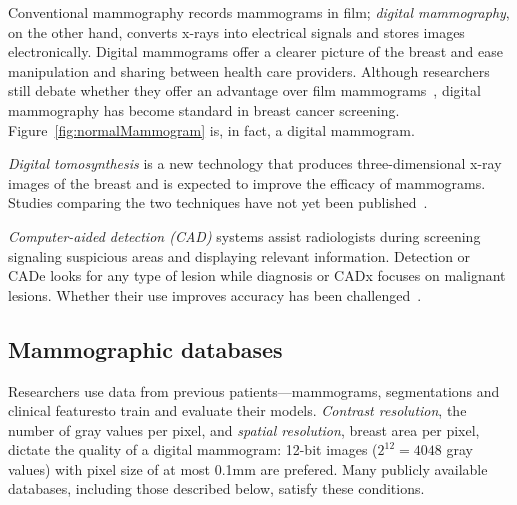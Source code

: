 Conventional mammography records mammograms in film; \emph{digital mammography}, on the other hand, converts x-rays into electrical signals and stores images electronically.
Digital mammograms offer a clearer picture of the breast and ease manipulation and sharing between health care providers.
Although researchers still debate whether they offer an advantage over film mammograms~\cite{Kerlikowske2011, Pisano2008, Skaane2007}, digital mammography has become standard in breast cancer screening. Figure~\ref{fig:normalMammogram} is, in fact, a digital mammogram.

\emph{Digital tomosynthesis} is a new technology that produces three-dimensional x-ray images of the breast and is expected to improve the efficacy of mammograms. Studies comparing the two techniques have not yet been published~\cite{NCI2014}.

\emph{Computer-aided detection (CAD)} systems assist radiologists during screening signaling suspicious areas and displaying relevant information. Detection or CADe looks for any type of lesion while diagnosis or CADx focuses on malignant lesions. Whether their use improves accuracy has been challenged~\cite{Lehman2015}.

\subsection{Mammographic databases}
Researchers use data from previous patients---mammograms, segmentations and clinical features\textemdash to train and evaluate their models. 
\emph{Contrast resolution}, the number of gray values per pixel, and \emph{spatial resolution}, breast area per pixel, dictate the quality of a digital mammogram: 12-bit images ($2^{12} = 4048$ gray values) with pixel size of at most 0.1mm are prefered. Many publicly available databases, including those described below, satisfy these conditions.

